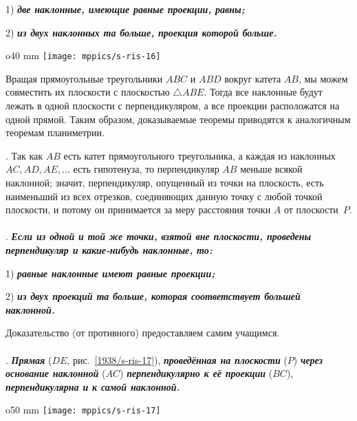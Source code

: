 1) \textbf{\emph{две наклонные, имеющие равные проекции, равны;}}

2) \textbf{\emph{из двух наклонных та больше, проекция которой больше.}} 

\begin{wrapfigure}{o}{40 mm}
\centering
\texttt{[image: mppics/s-ris-16]}
\caption{}\label{1938/s-ris-16}
\end{wrapfigure}

Вращая прямоугольные треугольники $ABC$ и $ABD$ вокруг катета $AB$, мы можем совместить их плоскости с плоскостью $\triangle ABE$.
Тогда все наклонные будут лежать в одной плоскости с перпендикуляром, а все проекции расположатся на одной прямой.
Таким образом, доказываемые теоремы приводятся к аналогичным теоремам планиметрии.

{\small
\medskip

\mbox{.}
Так как $AB$ есть катет прямоугольного треугольника, а каждая из наклонных $AC, AD, AE,\dots$ есть гипотенуза, то перпендикуляр $AB$ меньше всякой наклонной;
значит, перпендикуляр, опущенный из точки на плоскость, есть наименьший из всех отрезков, соединяющих данную точку с любой точкой плоскости, и потому он принимается за меру расстояния точки $A$ от плоскости~$P$.

}

\paragraph{}\label{1938/s27}
.
\textbf{\emph{Если из одной и той же точки, взятой вне плоскости, проведены перпендикуляр и какие-нибудь наклонные, то: }}

1) \textbf{\emph{равные наклонные имеют равные проекции;}}

2) \textbf{\emph{из двух проекций та больше, которая соответствует большей наклонной.}}

Доказательство (от противного) предоставляем самим учащимся.

\paragraph{}\label{1938/s28}.
\textbf{\emph{Прямая}} ($DE$, рис.~\ref{1938/s-ris-17}), \textbf{\emph{проведённая на плоскости}} ($P$) \textbf{\emph{через основание наклонной}} ($AC$) \textbf{\emph{перпендикулярно к её проекции}} ($BC$), \textbf{\emph{перпендикулярна и к самой наклонной.}}

\begin{wrapfigure}{o}{50 mm}
\centering
\texttt{[image: mppics/s-ris-17]}
\caption{}\label{1938/s-ris-17}
\end{wrapfigure}

